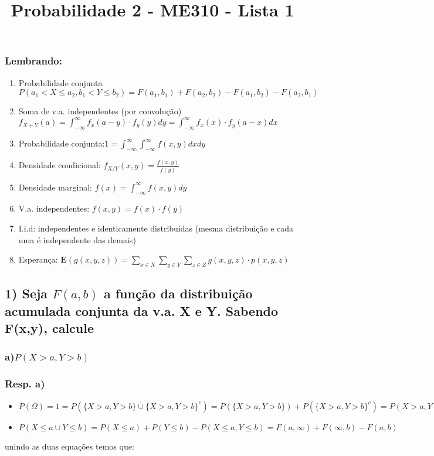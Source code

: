 \documentclass[portuguese]{article}
\begin{document}
\title{Probabilidade 2 - ME310 - Lista 1}

\maketitle

\subsubsection*{Lembrando:}
\begin{enumerate}
\item Probabilidade conjunta $P(a_{1}<X\leq a_{2},b_{1}<Y\leq b_{2})=F(a_{1},b_{1})+F(a_{2},b_{2})-F(a_{1},b_{2})-F(a_{2},b_{1})$
\item Soma de v.a. independentes (por convolução) $f_{X+Y}(a)=\int_{-\infty}^{\infty}f_{x}(a-y)\cdot f_{y}(y)dy=\int_{-\infty}^{\infty}f_{x}(x)\cdot f_{y}(a-x)dx$
\item Probabilidade conjunta:$1=\int_{-\infty}^{\infty}\int_{-\infty}^{\infty}f(x,y)dxdy$
\item Densidade condicional: $f_{X/Y}(x,y)=\frac{f(x,y)}{f(y)}$
\item Densidade marginal: $f(x)=\int_{-\infty}^{\infty}f(x,y)dy$
\item V.a. independentes: $f(x,y)=f(x)\cdot f(y)$
\item I.i.d: independentes e identicamente distribuídas (mesma distribuição
e cada uma é independente das demais)
\item Esperança: $\mathbf{E}(g(x,y,z))=\sum_{x\in X}\sum_{y\in Y}\sum_{z\in Z}g(x,y,z)\cdot p(x,y,z)$
\end{enumerate}
\pagebreak{}


\subsection*{\textmd{1) Seja $F(a,b)$ a função da distribuição acumulada conjunta
da v.a. X e Y. Sabendo F(x,y), calcule }}


\subsubsection*{\textmd{a)$P(X>a,Y>b)$ }}


\subsubsection*{\textmd{Resp. a)}}
\begin{itemize}
\item $P(\Omega)=1=P(\{X>a,Y>b\}\overset{.}{\cup}\{X>a,Y>b\}^{c})=P(\{X>a,Y>b\})+P(\{X>a,Y>b\}^{c})=P(X>a,Y>b)+P(X\leq a\cup Y\leq b)$
\item $P(X\leq a\cup Y\leq b)=P(X\leq a)+P(Y\leq b)-P(X\leq a,Y\leq b)=F(a,\infty)+F(\infty,b)-F(a,b)$
\end{itemize}
unindo as duas equações temos que:
\end{document}
